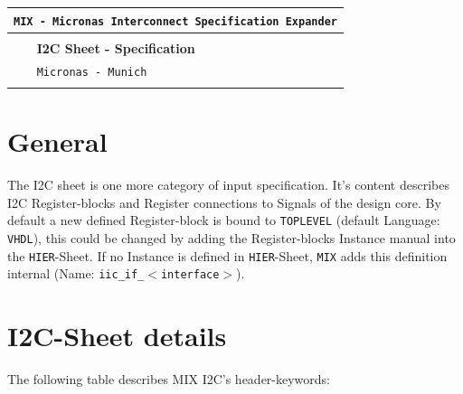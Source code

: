 \documentclass[a4paper,12pt]{report}
\begin{document}
\begin{titlepage}
\vspace*{70mm}
\centering
\begin{tabular}{p{20mm}l}
\multicolumn{2}{r}{\tt {MIX} - Micronas Interconnect Specification Expander}\\[1mm]
\hline \\[3mm]
&{\bf I2C Sheet - Specification}\\[5mm]
&{\tt Micronas - Munich}\\[5mm]
\hline \\[20mm]
\end{tabular}
\end{titlepage}


\raggedright

   \section{General}
The I2C sheet is one more category of input specification. It's content describes I2C Register-blocks and Register connections to Signals of the design core. By default a new defined Register-block is bound to {\tt TOPLEVEL} (default Language: {\tt VHDL}), this could be changed by adding the Register-blocks Instance manual into the {\tt HIER}-Sheet. If no Instance is defined in {\tt HIER}-Sheet, {\tt MIX} adds this definition internal (Name: {\tt iic\_if\_$<$interface$>$}).

\section{I2C-Sheet details}
The following table describes MIX I2C's header-keywords:
\end{document}
